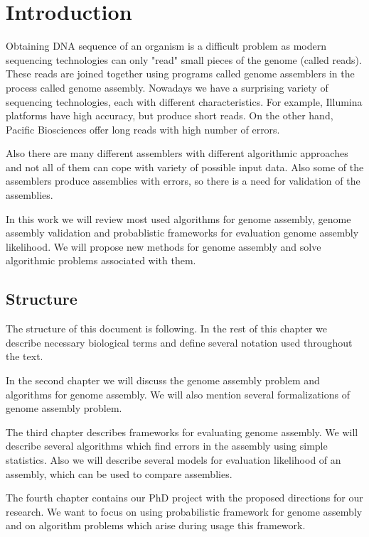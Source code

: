 \chapter{Introduction}

Obtaining DNA sequence of an organism is a difficult problem
as modern sequencing technologies can only "read" small pieces
of the genome (called reads). 
These reads are joined together using programs called genome assemblers
in the process called genome assembly.
Nowadays we have a surprising variety of sequencing technologies,
each with different characteristics. For example,
Illumina platforms have high accuracy, but produce short reads. 
On the other hand, Pacific Biosciences offer long reads with high number
of errors. 

Also there are many different assemblers with different algorithmic
approaches and not all of them can cope with variety of possible input data.
Also some of the assemblers produce assemblies with errors, so
there is a need for validation of the assemblies.

In this work we will review most used algorithms for genome assembly,
genome assembly validation and probablistic frameworks for evaluation
genome assembly likelihood. We will propose new methods
for genome assembly and solve algorithmic problems associated with them.

\section{Structure}

The structure of this document is following. In the rest of this chapter we
describe necessary biological terms and define several notation used throughout
the text.

In the second chapter we will discuss the genome assembly
problem and algorithms for genome assembly.
We will also mention several formalizations of genome assembly problem.

The third chapter describes frameworks for evaluating genome assembly.
We will describe several algorithms which find errors in the assembly
using simple statistics. Also we will describe several models
for evaluation likelihood of an assembly, which can be used
to compare assemblies.

The fourth chapter contains our PhD project with the proposed directions for our
research. We want to focus on using probabilistic framework 
for genome assembly and on algorithm problems which arise during usage this framework.

